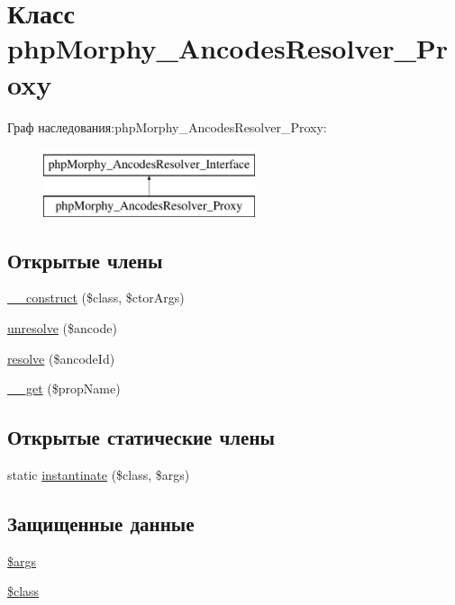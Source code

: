 \hypertarget{classphpMorphy__AncodesResolver__Proxy}{
\section{Класс phpMorphy\_\-AncodesResolver\_\-Proxy}
\label{classphpMorphy__AncodesResolver__Proxy}
}
Граф наследования:phpMorphy\_\-AncodesResolver\_\-Proxy:\begin{figure}[H]
\begin{center}
\leavevmode
\includegraphics[height=2.000000cm]{classphpMorphy__AncodesResolver__Proxy}
\end{center}
\end{figure}
\subsection*{Открытые члены}
\begin{DoxyCompactItemize}
\item 
\hyperlink{classphpMorphy__AncodesResolver__Proxy_a5de3ac13f7b8e1163e48b142e08d7e6a}{\_\-\_\-construct} (\$class, \$ctorArgs)
\item 
\hyperlink{classphpMorphy__AncodesResolver__Proxy_a5757e4d2b4e5b9bdf2a04397722c9a21}{unresolve} (\$ancode)
\item 
\hyperlink{classphpMorphy__AncodesResolver__Proxy_ac568db77ff1892beb35353e37fca1a8a}{resolve} (\$ancodeId)
\item 
\hyperlink{classphpMorphy__AncodesResolver__Proxy_a338f2bf90836eaaf0479a4fd297a32fd}{\_\-\_\-get} (\$propName)
\end{DoxyCompactItemize}
\subsection*{Открытые статические члены}
\begin{DoxyCompactItemize}
\item 
static \hyperlink{classphpMorphy__AncodesResolver__Proxy_a69726cdf4c105f8cb4c2eb10d7a73fa7}{instantinate} (\$class, \$args)
\end{DoxyCompactItemize}
\subsection*{Защищенные данные}
\begin{DoxyCompactItemize}
\item 
\hyperlink{classphpMorphy__AncodesResolver__Proxy_a5ecdcce0418f8b4f462f04316971e340}{\$args}
\item 
\hyperlink{classphpMorphy__AncodesResolver__Proxy_a484e215d187763693313a72668aaff32}{\$class}
\end{DoxyCompactItemize}


